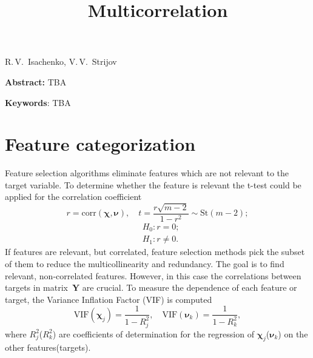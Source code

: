 \documentclass[12pt,twoside]{article}
\theoremstyle{definition}
\newcommand{\bY}{\mathbf{Y}}
\newcommand{\bchi}{\boldsymbol{\chi}}
\newcommand{\bnu}{\boldsymbol{\nu}}
\begin{document}
	
	\linenumbers
	
	\title
{Multicorrelation}
\date{}
\maketitle
\begin{center}
	R.\,V.~Isachenko,
	V.\,V.~Strijov
\end{center}
\textbf{Abstract:} 
TBA

\bigskip
\textbf{Keywords}: TBA

\section{Feature categorization}
Feature selection algorithms eliminate features which are not relevant to the target variable.
To determine whether the feature is relevant the t-test could be applied for the correlation coefficient
\[
	r = \text{corr} (\bchi, \bnu), \quad t = \frac{r \sqrt{m - 2}}{1 - r^2} \sim \text{St} (m - 2);
\]
\begin{align*}
&H_0: r = 0; \\
&H_1: r \neq 0.
\end{align*}
If features are relevant, but correlated, feature selection methods pick the subset of them to reduce the multicollinearity and redundancy.
The goal is to find relevant, non-correlated features.
However, in this case the correlations between targets in matrix~$\bY$ are crucial.
To measure the dependence of each feature or target, the Variance Inflation Factor (VIF) is computed
\[
	\text{VIF}(\bchi_j) = \frac{1}{1 - R_j^2}, \quad \text{VIF}(\bnu_k) = \frac{1}{1 - R_k^2},
\]
where $R_j^2$($R_k^2$) are coefficients of determination for the regression of $\bchi_j$($\bnu_k$) on the other features(targets).
\end{document}

